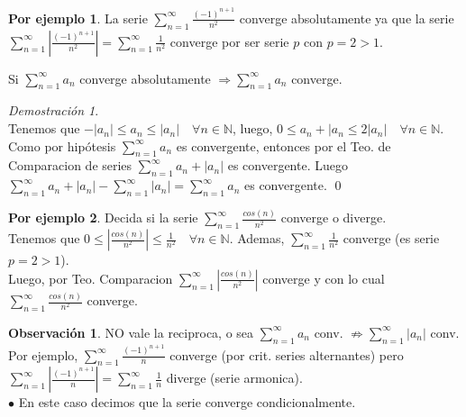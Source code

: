 \documentclass{article}
\theoremstyle{definition}
\theoremstyle{definition}
\newtheorem*{obs}{Observación}
\newtheorem*{ej}{Por ejemplo}
\theoremstyle{remark}
\newtheorem*{demo}{Demostración}
\begin{document}
\begin{ej}
  La serie $\sum_{n=1}^{\infty}{\frac{(-1)^{n+1}}{n^2}}$ converge absolutamente ya que la serie\\
  $\sum_{n=1}^{\infty}{\left\vert\frac{(-1)^{n+1}}{n^2}\right\vert} = \sum_{n=1}^{\infty}{\frac{1}{n^2}}$ converge por ser serie $p$ con $p=2>1$.
\end{ej}

\begin{teo}
  Si $\sum_{n=1}^{\infty}{a_n}$ converge absolutamente $\Longrightarrow \sum_{n=1}^{\infty}{a_n}$ converge.
\end{teo}

\begin{demo} \; \\
  Tenemos que $-|a_n| \leq a_n \leq |a_n| \quad \forall n \in \mathbb{N}$, luego, $0 \leq a_n + |a_n \leq 2 |a_n| \quad \forall n \in \mathbb{N}$. Como por hipótesis $\sum_{n=1}^{\infty}{a_n}$ es convergente, entonces por el Teo. de Comparacion de series $\sum_{n=1}^{\infty}{a_n+|a_n|}$ es convergente. Luego $\sum_{n=1}^{\infty}{a_n+|a_n|}-\sum_{n=1}^{\infty}{|a_n|}=\sum_{n=1}^{\infty}{a_n}$ es convergente. \qed
\end{demo}


\begin{ej}
  Decida si la serie $\sum_{n=1}^{\infty}{\frac{cos(n)}{n^2}}$ converge o diverge. \\
  Tenemos que $0 \leq \left| \frac{cos(n)}{n^2} \right| \leq \frac{1}{n^2} \quad \forall n \in \mathbb{N}$. Ademas, $\sum_{n=1}^{\infty}{\frac{1}{n^2}}$ converge (es serie $p=2>1$). \\
  Luego, por Teo. Comparacion $\sum_{n=1}^{\infty}{\left| \frac{cos(n)}{n^2} \right|}$ converge y con lo cual $\sum_{n=1}^{\infty}{\frac{cos(n)}{n^2}}$ converge.
\end{ej}

\begin{obs}
  NO vale la reciproca, o sea $\sum_{n=1}^{\infty}{a_n}$ conv. $\not\Rightarrow \sum_{n=1}^{\infty}{|a_n|}$ conv. \\
  Por ejemplo, $\sum_{n=1}^{\infty}{\frac{(-1)^{n+1}}{n}}$ converge (por crit. series alternantes) pero \\ $\sum_{n=1}^{\infty}{ \left| \frac{(-1)^{n+1}}{n} \right|} = \sum_{n=1}^{\infty}{\frac{1}{n}}$ diverge (serie armonica). \\
  $\bullet$ \quad En este caso decimos que la serie converge condicionalmente.
\end{obs}
\end{document}
